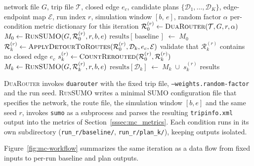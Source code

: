 \begin{algorithm}[htbp]
\caption{\textsc{MonteCarloIteration}}\label{alg:mc_iter}
\begin{algorithmic}[1]
\Require network file $G$,
         trip file $\mathcal{T}$,
         closed edge $e_c$,
         candidate plans $\{\mathcal{D}_1, \ldots, \mathcal{D}_K\}$,
         edge-endpoint map $\mathcal{E}$,
         run index $r$,
         simulation window $[b,\, e]$,
         random factor $\alpha$
\Ensure  per-condition metric dictionary for this iteration
\State $\mathcal{R}_0^{(r)} \leftarrow
       \textsc{DuaRouter}(\mathcal{T},G,r,\alpha)$
\State $M_0 \leftarrow \textsc{RunSUMO}(G,\mathcal{R}_0^{(r)},r,b,e)$
\State $\text{results}[\,\text{baseline}\,] \;\leftarrow\; M_0$
  \State $\mathcal{R}_k^{(r)} \leftarrow
         \textsc{ApplyDetourToRoutes}(\mathcal{R}_0^{(r)},\mathcal{D}_k,e_c,\mathcal{E})$
  \State validate that $\mathcal{R}_k^{(r)}$ contains no closed edge $e_c$
  \State $s_k^{(r)} \leftarrow
         \textsc{CountRerouted}(\mathcal{R}_0^{(r)},\mathcal{R}_k^{(r)})$
  \State $M_k \leftarrow \textsc{RunSUMO}(G,\mathcal{R}_k^{(r)},r,b,e)$
  \State $\text{results}[\mathcal{D}_k] \;\leftarrow\; M_k \;\cup\; s_k^{(r)}$
\EndFor
\State \Return results
\end{algorithmic}
\end{algorithm}

\textsc{DuaRouter} invokes \texttt{duarouter} with the fixed trip file,
\texttt{--weights.random-factor} and the run seed. \textsc{RunSUMO} writes a
minimal SUMO configuration file that specifies the network, the route file,
the simulation window $[b, e]$ and the same seed $r$, invokes \texttt{sumo}
as a subprocess and parses the resulting \texttt{tripinfo.xml} output into
the metrics of Section~\ref{sssec:mc_metrics}. Each condition runs in its own
subdirectory (\texttt{run\_r/baseline/}, \texttt{run\_r/plan\_k/}), keeping
outputs isolated.

Figure~\ref{fig:mc-workflow} summarizes the same iteration as a data flow from
fixed inputs to per-run baseline and plan outputs.

